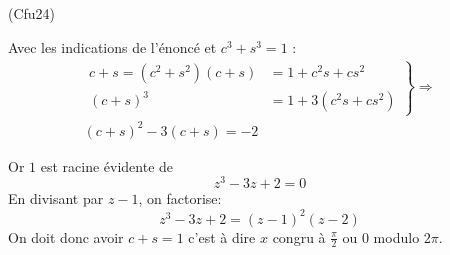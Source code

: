 \begin{tiny}(Cfu24)\end{tiny} Avec les indications de l'énoncé et $c^3+s^3=1$ :
\begin{multline*}
\left. 
\begin{aligned}
  c+s=(c^2+s^2)(c+s) &= 1 + c^2s + cs^2 \\
  (c+s)^3 &= 1 + 3(c^2s + cs^2)
\end{aligned}
\right\rbrace \Rightarrow \\
(c+s)^2-3(c+s) = -2
\end{multline*}

Or $1$ est racine évidente de
\begin{displaymath}
  z^3-3z+2 = 0
\end{displaymath}
En divisant par $z-1$, on factorise:
\begin{displaymath}
  z^3-3z+2=(z-1)^2(z-2)
\end{displaymath}
On doit donc avoir $c+s=1$ c'est à dire $x$ congru à $\frac{\pi}{2}$ ou $0$ modulo $2\pi$.
